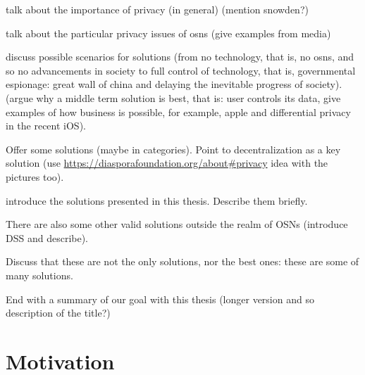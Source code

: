 \documentclass[showtrims]{kthesis}
\begin{document}
talk about the importance of privacy (in general) (mention snowden?)

talk about the particular privacy issues of osns (give examples from media)

discuss possible scenarios for solutions (from no technology, that is, no osns, 
and so no advancements in society to full control of technology, that is, governmental 
espionage: great wall of china and delaying the inevitable progress of society). 
(argue why a middle term solution is best, that is: user controls 
its data, give examples of how business is possible, for example, apple and differential 
privacy in the recent iOS).

Offer some solutions (maybe in categories). Point to decentralization as a key solution
(use \url{https://diasporafoundation.org/about#privacy} idea with the pictures too).

introduce the solutions presented 
in this thesis. Describe them briefly.

There are also some other valid solutions outside the realm of OSNs (introduce DSS 
and describe).

Discuss that these are not the only solutions, nor the best ones: these are some 
of many solutions.

End with a summary of our goal with this thesis (longer version and so description of the title?)


%
%
%
%
%
%
%
%
%

\section{Motivation}
\end{document}
